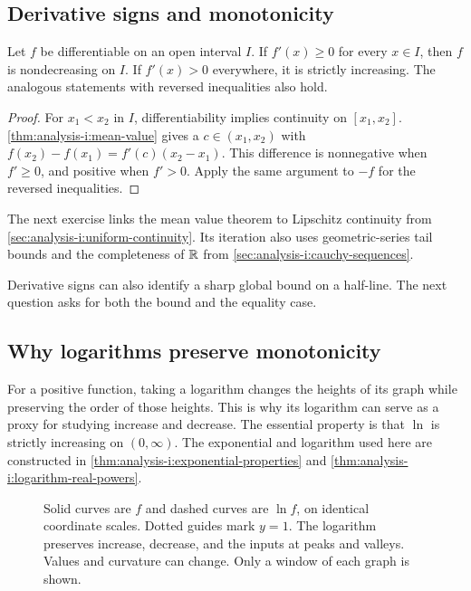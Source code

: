 \subsection{Derivative signs and monotonicity}
\begin{corollary}
  \label{thm:analysis-i:derivative-monotonicity}
  Let $f$ be differentiable on an open interval $I$.
  If $f'(x)\ge0$ for every $x\in I$, then $f$ is nondecreasing on $I$.
  If $f'(x)>0$ everywhere, it is strictly increasing.
  The analogous statements with reversed inequalities also hold.
\end{corollary}
\begin{proof}
  For $x_1<x_2$ in $I$, differentiability implies continuity on
  $[x_1,x_2]$. \autoref{thm:analysis-i:mean-value} gives a $c\in(x_1,x_2)$ with
  $f(x_2)-f(x_1)=f'(c)(x_2-x_1)$. This difference is nonnegative when
  $f'\ge0$, and positive when $f'>0$. Apply the same argument to $-f$
  for the reversed inequalities.
\end{proof}

The next exercise links the mean value theorem to Lipschitz continuity
from \autoref{sec:analysis-i:uniform-continuity}. Its iteration also uses
geometric-series tail bounds and the completeness of $\mathbb{R}$ from
\autoref{sec:analysis-i:cauchy-sequences}.


Derivative signs can also identify a sharp global
bound on a half-line. The next question asks for both the bound and
the equality case.


\subsection{Why logarithms preserve monotonicity}

For a positive function, taking a logarithm changes the heights of its
graph while preserving the order of those heights. This is why its
logarithm can serve as a proxy for studying increase and decrease.
The essential property is that $\ln$ is strictly increasing on
$(0,\infty)$. The exponential and logarithm used here are constructed
in \autoref{thm:analysis-i:exponential-properties} and
\autoref{thm:analysis-i:logarithm-real-powers}.

\begin{figure}[htbp]
  \centering
  
  \caption[Logarithms preserve order.]{Solid curves
    are $f$ and dashed curves are $\ln f$, on identical coordinate
    scales. Dotted guides mark $y=1$. The logarithm preserves increase,
    decrease, and the inputs at peaks and valleys. Values and curvature
    can change. Only a window of each graph is shown.}
  \label{fig:analysis-i:logarithm-monotonicity}
\end{figure}

